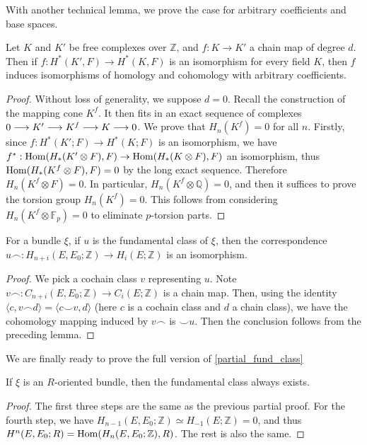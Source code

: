 	With another technical lemma, we prove the case for arbitrary coefficients and base spaces. 
	\begin{lemma}
		Let $K$ and $K'$ be free complexes over $\mathbb{Z}$, and $f:K\to K'$ a chain map of degree $d$. Then if $f:H^*(K',F)\to H^*(K,F)$ is an isomorphism for every field $K$, then $f$ induces isomorphisms of homology and cohomology with arbitrary coefficients. 
	\end{lemma}
	\begin{proof}
		Without loss of generality, we suppose $d=0$. Recall the construction of the mapping cone $K^f$. It then fits in an exact sequence of complexes $0\longrightarrow K'\longrightarrow K^f\longrightarrow K\longrightarrow 0$. We prove that $H_n(K^f)=0$ for all $n$. Firstly, since $f:H^*(K';F)\to H^*(K;F)$ is an isomorphism, we have $f^*:\operatorname{\mathrm{Hom}}(H_*(K'\otimes F),F)\to\operatorname{\mathrm{Hom}}(H_*(K\otimes F),F)$ an isomorphism, thus $\operatorname{\mathrm{Hom}}(H_*(K^f\otimes F),F)=0$ by the long exact sequence. Therefore $H_n(K^f\otimes F)=0$. In particular, $H_n(K^f\otimes\mathbb{Q})=0$, and then it suffices to prove the torsion group $H_n(K^f)=0$. This follows from considering $H_n(K^f\otimes\mathbb{F}_p)=0$ to eliminate $p$-torsion parts. 
	\end{proof}

	\begin{prop}
		For a bundle $\xi$, if $u$ is the fundamental class of $\xi$, then the correspondence $u\frown:H_{n+i}(E,E_0;\mathbb{Z})\to H_i(E;\mathbb{Z})$ is an isomorphism. 
	\end{prop}
	\begin{proof}
		We pick a cochain class $v$ representing $u$. Note $v\frown:C_{n+i}(E,E_0;\mathbb{Z})\to C_i(E;\mathbb{Z})$ is a chain map. Then, using the identity $\langle c,v\frown d\rangle=\langle c\smile v,d\rangle$ (here $c$ is a cochain class and $d$ a chain class), we have the cohomology mapping induced by $v\frown$ is $\smile u$. Then the conclusion follows from the preceding lemma. 
	\end{proof}

	We are finally ready to prove the full version of \cref{partial_fund_class}
	\begin{thm} \label{fund_class}
		If $\xi$ is an $R$-oriented bundle, then the fundamental class always exists. 
	\end{thm}
	\begin{proof}
		The first three steps are the same as the previous partial proof. For the fourth step, we have $H_{n-1}(E,E_0;\mathbb{Z})\simeq H_{-1}(E;\mathbb{Z})=0$, and thus $H^n(E,E_0;R)=\operatorname{\mathrm{Hom}}(H_n(E,E_0;\mathbb{Z}),R)$. The rest is also the same. 
	\end{proof}

